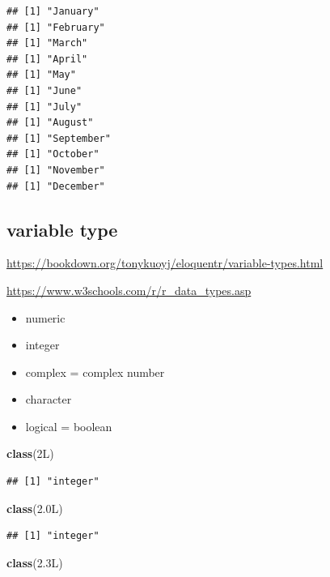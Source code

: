 \documentclass[
]{book}
\newenvironment{Shaded}{\begin{snugshade}}{\end{snugshade}}
\newcommand{\FloatTok}[1]{\textcolor[rgb]{0.00,0.00,0.81}{#1}}
\newcommand{\FunctionTok}[1]{\textcolor[rgb]{0.13,0.29,0.53}{\textbf{#1}}}
\newcommand{\NormalTok}[1]{#1}
\providecommand{\tightlist}{%
  \setlength{\itemsep}{0pt}\setlength{\parskip}{0pt}}
\theoremstyle{definition}
\theoremstyle{definition}
\theoremstyle{definition}
\theoremstyle{definition}
\theoremstyle{remark}
\begin{document}
\begin{verbatim}
## [1] "January"
## [1] "February"
## [1] "March"
## [1] "April"
## [1] "May"
## [1] "June"
## [1] "July"
## [1] "August"
## [1] "September"
## [1] "October"
## [1] "November"
## [1] "December"
\end{verbatim}

\hypertarget{variable-type}{%
\subsection{variable type}\label{variable-type}}

\url{https://bookdown.org/tonykuoyj/eloquentr/variable-types.html}

\url{https://www.w3schools.com/r/r_data_types.asp}

\begin{itemize}
\tightlist
\item
  numeric
\item
  integer
\item
  complex = complex number
\item
  character
\item
  logical = boolean
\end{itemize}

\begin{Shaded}
\begin{Highlighting}[]
\FunctionTok{class}\NormalTok{(2L)}
\end{Highlighting}
\end{Shaded}

\begin{verbatim}
## [1] "integer"
\end{verbatim}

\begin{Shaded}
\begin{Highlighting}[]
\FunctionTok{class}\NormalTok{(}\FloatTok{2.0}\NormalTok{L)}
\end{Highlighting}
\end{Shaded}

\begin{verbatim}
## [1] "integer"
\end{verbatim}

\begin{Shaded}
\begin{Highlighting}[]
\FunctionTok{class}\NormalTok{(}\FloatTok{2.3}\NormalTok{L)}
\end{Highlighting}
\end{Shaded}
\end{document}
